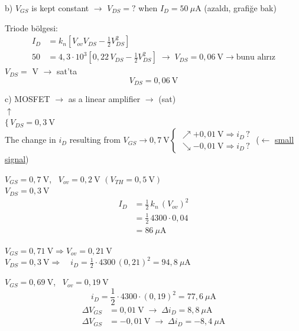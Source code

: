 \documentclass[11pt,a4paper]{article}
\begin{document}
\noindent b) $V_{GS}$ is kept constant $\rightarrow$ $V_{DS} = ?$ when $I_D = 50\ \mu\mathrm{A}$
\hfill{\small(azaldı, grafiğe bak)}

\begin{cozum}
Triode bölgesi:
\begin{align*}
  I_D &= k_n\left[V_{ov}V_{DS} - \frac{1}{2}V_{DS}^2\right]\\
  50 &= 4{,}3\cdot10^3\left[0{,}22\,V_{DS} - \frac{1}{2}V_{DS}^2\right]
  \;\longrightarrow\; \boxed{V_{DS} = 0{,}06\ \mathrm{V}} \rightarrow \text{bunu alırız}
\end{align*}
\hfill $V_{DS} = $  V $\rightarrow$ sat'ta
\[
  V_{DS} = 0{,}06\ \mathrm{V}
\]
\end{cozum}

\noindent c) MOSFET $\rightarrow$ as a linear amplifier $\rightarrow$ (sat)\\[1mm]
\hspace*{1em}$\uparrow$\\
\hspace*{1em}$\{\,V_{DS} = 0{,}3\ \mathrm{V}$\\[1mm]
The change in $i_D$ resulting from
$V_{GS} \rightarrow 0{,}7\ \mathrm{V}
\begin{cases}
  \nearrow +0{,}01\ \mathrm{V} \Rightarrow i_D\,?\\
  \searrow -0{,}01\ \mathrm{V} \Rightarrow i_D\,?
\end{cases}$
\quad ($\leftarrow$ \underline{small signal})

\begin{cozum}
$V_{GS} = 0{,}7\ \mathrm{V}$, \ $V_{ov} = 0{,}2\ \mathrm{V}$ \hfill $(V_{TH} = 0{,}5\ \mathrm{V})$\\
$V_{DS} = 0{,}3\ \mathrm{V}$
\begin{align*}
  I_D &= \frac{1}{2}\,k_n\,(V_{ov})^2\\
      &= \frac{1}{2}\,4300\cdot 0{,}04\\
      &= 86\ \mu\mathrm{A}
\end{align*}

$V_{GS} = 0{,}71\ \mathrm{V} \Rightarrow V_{ov} = 0{,}21\ \mathrm{V}$\\
$V_{DS} = 0{,}3\ \mathrm{V} \Rightarrow \quad
  i_D = \frac{1}{2}\cdot 4300\,(0{,}21)^2 = 94{,}8\ \mu\mathrm{A}$

\medskip
$V_{GS} = 0{,}69\ \mathrm{V}$, \ $V_{ov} = 0{,}19\ \mathrm{V}$
\[
  i_D = \frac{1}{2}\cdot 4300\cdot(0{,}19)^2 = 77{,}6\ \mu\mathrm{A}
\]
\begin{align*}
  \Delta V_{GS} &= 0{,}01\ \mathrm{V} \;\rightarrow\; \Delta i_D = 8{,}8\ \mu\mathrm{A}\\
  \Delta V_{GS} &= -0{,}01\ \mathrm{V} \;\rightarrow\; \Delta i_D = -8{,}4\ \mu\mathrm{A}
\end{align*}
\end{cozum}
\end{document}
